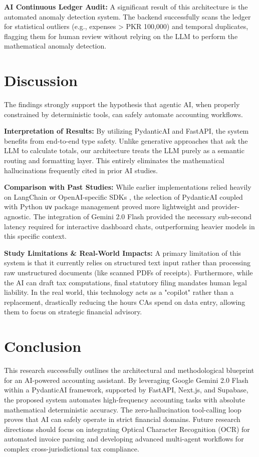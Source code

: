 \documentclass[12pt,a4paper]{article}
\begin{document}
\textbf{AI Continuous Ledger Audit:}
A significant result of this architecture is the automated anomaly detection system. The backend successfully scans the ledger for statistical outliers (e.g., expenses > PKR 100,000) and temporal duplicates, flagging them for human review without relying on the LLM to perform the mathematical anomaly detection.

\section{Discussion}
The findings strongly support the hypothesis that agentic AI, when properly constrained by deterministic tools, can safely automate accounting workflows. 

\textbf{Interpretation of Results:} By utilizing PydanticAI and FastAPI, the system benefits from end-to-end type safety. Unlike generative approaches that ask the LLM to calculate totals, our architecture treats the LLM purely as a semantic routing and formatting layer. This entirely eliminates the mathematical hallucinations frequently cited in prior AI studies.

\textbf{Comparison with Past Studies:} While earlier implementations relied heavily on LangChain \cite{langchain2025} or OpenAI-specific SDKs \cite{openai2025}, the selection of PydanticAI coupled with Python \texttt{uv} package management proved more lightweight and provider-agnostic. The integration of Gemini 2.0 Flash \cite{gemini2025} provided the necessary sub-second latency required for interactive dashboard chats, outperforming heavier models in this specific context.

\textbf{Study Limitations \& Real-World Impacts:} 
A primary limitation of this system is that it currently relies on structured text input rather than processing raw unstructured documents (like scanned PDFs of receipts). Furthermore, while the AI can draft tax computations, final statutory filing mandates human legal liability. In the real world, this technology acts as a "copilot" rather than a replacement, drastically reducing the hours CAs spend on data entry, allowing them to focus on strategic financial advisory.

\section{Conclusion}
This research successfully outlines the architectural and methodological blueprint for an AI-powered accounting assistant. By leveraging Google Gemini 2.0 Flash within a PydanticAI framework, supported by FastAPI, Next.js, and Supabase, the proposed system automates high-frequency accounting tasks with absolute mathematical deterministic accuracy. The zero-hallucination tool-calling loop proves that AI can safely operate in strict financial domains. Future research directions should focus on integrating Optical Character Recognition (OCR) for automated invoice parsing and developing advanced multi-agent workflows for complex cross-jurisdictional tax compliance.
\end{document}
